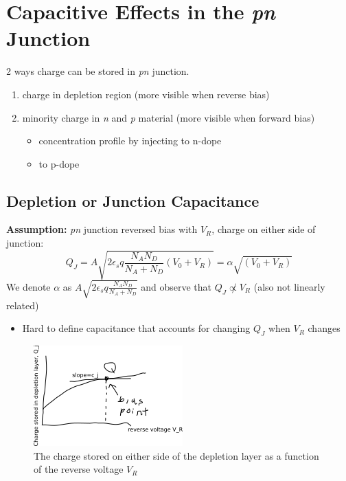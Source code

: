 \documentclass{report}
\begin{document}
\section{Capacitive Effects in the \textit{pn} Junction}

2 ways charge can be stored in \textit{pn} junction.
\begin{enumerate}
	\item charge in depletion region (more visible when reverse bias)
	\item minority charge in \textit{n} and \textit{p} material (more visible when forward bias)
	\begin{itemize}
		\item concentration profile by injecting to n-dope
		\item {}\phantom{concentration profile by injecting} to p-dope
	\end{itemize}
\end{enumerate}

\subsection{Depletion or Junction Capacitance}

\textbf{Assumption:} \textit{pn} junction reversed bias with $V_R$, charge on either side of junction:
\begin{equation}
	Q_J = A \sqrt{2\epsilon_s q \frac{N_A N_D}{N_A + N_D} \left(V_0 + V_R\right)} = \alpha \sqrt{\left(V_0 + V_R\right)}
	\label{eq:3.6-alpha-v0-vr}
\end{equation}
We denote $\alpha$ as $A \sqrt{2\epsilon_s q \frac{N_A N_D}{N_A + N_D}}$ and observe that $Q_J \not\propto V_R$ (also not linearly related)
\begin{itemize}
	\item Hard to define capacitance that accounts for changing $Q_J$ when $V_R$ changes
\end{itemize}

\begin{figure}[!hbpt]
	\centering
	\includegraphics{path172092.png}
	\caption{The charge stored on either side of the depletion layer as a function of the reverse voltage $V_R$}
	\label{fig:charge-volt-cap-graph}
\end{figure}
\end{document}
